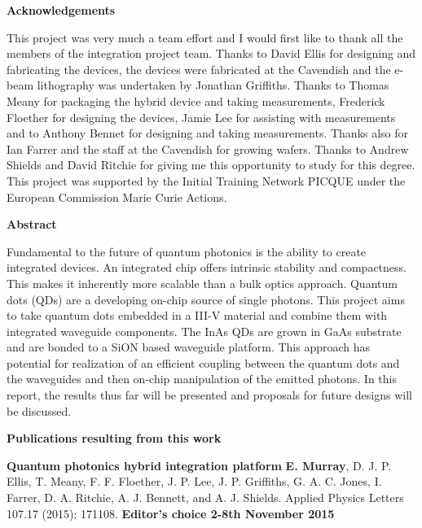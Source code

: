 \documentclass[12pt, oneside]{book}
\begin{document}
\title{}  \author{} \date{}
\maketitle

\begin{center} \large \textbf{Acknowledgements} \end{center}

This project was very much a team effort and I would first like to thank all the
members of the integration project team. Thanks to David Ellis for designing and
fabricating the devices, the devices were fabricated at the Cavendish and the
e-beam lithography was undertaken by Jonathan Griffiths. Thanks to Thomas Meany
for packaging the hybrid device and taking measurements, Frederick Floether for
designing the devices, Jamie Lee for assisting with measurements and to Anthony
Bennet for designing and taking measurements. Thanks also for Ian Farrer and the
staff at the Cavendish for growing wafers. Thanks to Andrew Shields and David
Ritchie for giving me this opportunity to study for this degree. This project was
supported by the Initial Training Network PICQUE under the European Commission
Marie Curie Actions.

\newpage \begin{center} \large \textbf{Abstract} \end{center}

Fundamental to the future of quantum photonics is the ability to create
integrated devices. An integrated chip offers intrinsic stability and
compactness. This makes it inherently more scalable than a bulk optics approach.
Quantum dots (QDs) are a developing on-chip source of single photons. This
project aims to take quantum dots embedded in a III-V material and combine them
with integrated waveguide components. The InAs QDs are grown in GaAs substrate
and are bonded to a SiON based waveguide platform. This approach has potential
for realization of an efficient coupling between the quantum dots and the
waveguides and then on-chip manipulation of the emitted photons. In this report,
the results thus far will be presented and proposals for future designs will be
discussed.

\newpage \large\textbf{Publications resulting from this work}

\small \textbf{Quantum photonics hybrid integration platform} \newline
\textbf{E. Murray}, D. J. P. Ellis, T. Meany, F. F. Floether, J. P. Lee, J. P.
Griffiths, G. A. C. Jones, I. Farrer, D. A. Ritchie, A. J. Bennett, and A. J.
Shields. \newline Applied Physics Letters 107.17 (2015): 171108. \newline \textbf{Editor's choice 2-8th November 2015}
\end{document}
